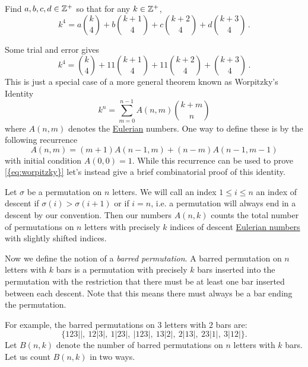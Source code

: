 \documentclass[a4paper, english, 12pt]{article} %
\begin{document}
\begin{subproblem}
  Find $a,b,c,d \in \mathbb{Z}^+$ so that for any $k \in \mathbb{Z}^+$,
  \begin{equation*}
    k^4 = a \binom{k}{4} + b \binom{k+1}{4} + c \binom{k+2}{4} + d \binom{k+3}{4}\,.
  \end{equation*}
\end{subproblem}

\begin{answer}
  Some trial and error gives
  \begin{equation*}
    k^4 = \binom{k}{4} + 11 \binom{k+1}{4} + 11\binom{k+2}{4} + \binom{k+3}{4}\,.
  \end{equation*}
  This is just a special case of a more general theorem known as
  Worpitzky’s Identity
  \begin{equation}
    \label{eq:worpitzky}
    k^n = \sum_{m=0}^{n-1} A(n, m) \binom{k + m}{n}
  \end{equation}
  where $A(n, m)$ denotes the
  \href{https://en.wikipedia.org/wiki/Eulerian_number}{Eulerian} numbers. One
  way to define these is by the following recurrence
  \begin{equation}
    \label{eq:reccurrence}
    A(n, m) = (m + 1) A(n - 1, m) + (n - m)A(n - 1, m - 1)
  \end{equation}
  with initial condition $A(0,0)=1$. While this recurrence can be used to prove
  \cref{{eq:worpitzky}} let's instead give a brief combinatorial proof of this
  identity. 

  Let $\sigma$ be a permutation on $n$ letters. We will call an index $1 \le i
  \le n$ an index of descent if $\sigma(i) > \sigma(i+1)$ or if $i=n$, i.e. a
  permutation will always end in a descent by our convention. Then our numbers
  $A(n,k)$ counts the total number of permutations on $n$ letters with precisely
  $k$ indices of descent \href{http://en.wikipedia.org/wiki/Eulerian_number}{Eulerian
  numbers} with slightly shifted
  indices.

  Now we define the notion of a \emph{barred permutation}. A barred permutation on
  $n$ letters with $k$ bars is a permutation with precisely $k$ bars inserted
  into the permutation with the restriction that there must be at least one bar
  inserted between each descent. Note that this means there must always be a bar
  ending the permutation.

  For example, the barred permutations on $3$ letters with $2$ bars are:
  \begin{equation*}
    \{123||,\ 12|3|,\ 1|23|,\ |123|,\ 13|2|,\ 2|13|,\ 23|1|,\ 3|12|\}.
  \end{equation*}
  Let $B(n,k)$ denote the number of barred permutations on $n$ letters with $k$
  bars. Let us count $B(n,k)$ in two ways.


\end{answer}
\end{document}

